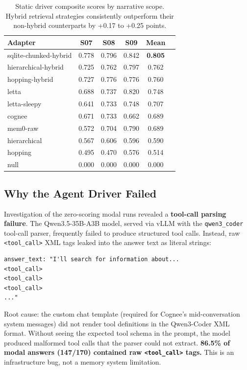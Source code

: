 \documentclass[11pt,letterpaper]{article}
\begin{document}
\begin{table}[H]
\centering
\small
\begin{tabular}{lccccc}
\toprule
\textbf{Adapter} & \textbf{S07} & \textbf{S08} & \textbf{S09} & \textbf{Mean} \\
\midrule
\rowcolor{toprow}
sqlite-chunked-hybrid & 0.778 & 0.796 & 0.842 & \textbf{0.805} \\
hierarchical-hybrid & 0.725 & 0.762 & 0.797 & 0.762 \\
hopping-hybrid & 0.727 & 0.776 & 0.776 & 0.760 \\
letta & 0.688 & 0.737 & 0.820 & 0.748 \\
letta-sleepy & 0.641 & 0.733 & 0.748 & 0.707 \\
cognee & 0.671 & 0.733 & 0.662 & 0.689 \\
mem0-raw & 0.572 & 0.704 & 0.790 & 0.689 \\
hierarchical & 0.567 & 0.606 & 0.596 & 0.590 \\
hopping & 0.495 & 0.470 & 0.576 & 0.514 \\
null & 0.000 & 0.000 & 0.000 & 0.000 \\
\bottomrule
\end{tabular}
\caption{Static driver composite scores by narrative scope. Hybrid retrieval strategies consistently outperform their non-hybrid counterparts by +0.17 to +0.25 points.}
\label{tab:phase6-static}
\end{table}

\subsection{Why the Agent Driver Failed}

Investigation of the zero-scoring modal runs revealed a \textbf{tool-call parsing failure}. The Qwen3.5-35B-A3B model, served via vLLM with the \texttt{qwen3\_coder} tool-call parser, frequently failed to produce structured tool calls. Instead, raw \texttt{<tool\_call>} XML tags leaked into the answer text as literal strings:

\begin{verbatim}
answer_text: "I'll search for information about...
<tool_call>
<tool_call>
<tool_call>
..."
\end{verbatim}

Root cause: the custom chat template (required for Cognee's mid-conversation system messages) did not render tool definitions in the Qwen3-Coder XML format. Without seeing the expected tool schema in the prompt, the model produced malformed tool calls that the parser could not extract. \textbf{86.5\% of modal answers (147/170) contained raw \texttt{<tool\_call>} tags.} This is an infrastructure bug, not a memory system limitation.
\end{document}
